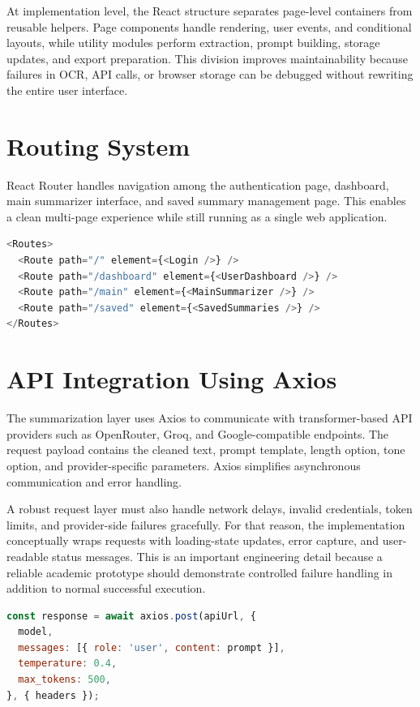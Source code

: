 \documentclass[12pt, a4paper]{report}
\begin{document}
At implementation level, the React structure separates page-level containers from reusable helpers. Page components handle rendering, user events, and conditional layouts, while utility modules perform extraction, prompt building, storage updates, and export preparation. This division improves maintainability because failures in OCR, API calls, or browser storage can be debugged without rewriting the entire user interface.

\section{Routing System}
React Router handles navigation among the authentication page, dashboard, main summarizer interface, and saved summary management page. This enables a clean multi-page experience while still running as a single web application.

\begin{lstlisting}[language=JavaScript,caption={Simplified Routing Structure}]
<Routes>
  <Route path="/" element={<Login />} />
  <Route path="/dashboard" element={<UserDashboard />} />
  <Route path="/main" element={<MainSummarizer />} />
  <Route path="/saved" element={<SavedSummaries />} />
</Routes>
\end{lstlisting}

\section{API Integration Using Axios}
The summarization layer uses Axios to communicate with transformer-based API providers such as OpenRouter, Groq, and Google-compatible endpoints. The request payload contains the cleaned text, prompt template, length option, tone option, and provider-specific parameters. Axios simplifies asynchronous communication and error handling.

A robust request layer must also handle network delays, invalid credentials, token limits, and provider-side failures gracefully. For that reason, the implementation conceptually wraps requests with loading-state updates, error capture, and user-readable status messages. This is an important engineering detail because a reliable academic prototype should demonstrate controlled failure handling in addition to normal successful execution.

\begin{lstlisting}[language=JavaScript,caption={Illustrative Axios Summarization Request}]
const response = await axios.post(apiUrl, {
  model,
  messages: [{ role: 'user', content: prompt }],
  temperature: 0.4,
  max_tokens: 500,
}, { headers });
\end{lstlisting}
\end{document}
